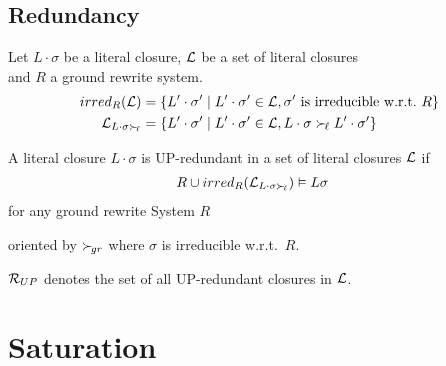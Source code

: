 \documentclass[%
handout,
]{beamer}
\begin{document}
\subsection{Redundancy}
\begin{frame}%
    \begin{definition}
        Let $L\cdot\sigma$ be a literal closure,
        $\mathcal{L}$ be a set of literal closures\\
        and $R$ a ground rewrite system.
        \begin{align*}
            irred_R(\mathcal{L}) &= \{
                L'\cdot\sigma' \mid
                L'\cdot\sigma'\in\mathcal{L},
                \sigma'\text{ is irreducible w.r.t.~}R
            \}
            \\
            \mathcal{L}_{L\cdot\sigma\mathrel\succ_{\!\ell}} &= \{
                L'\cdot\sigma' \mid
                L'\cdot\sigma'\in\mathcal{L},
                L\cdot\sigma\mathrel\succ_{\!\ell} L'\cdot\sigma'
            \}
        \end{align*}
    \end{definition}
\begin{definition}
    A literal closure $L\cdot\sigma$ is UP-redundant
    in a set of literal closures $\mathcal{L}$ if
    \begin{align*}
        R \cup irred_R(\mathcal{L}_{L\cdot\sigma\mathrel\succ_{\!\ell}}) &\vDash L\sigma
    \end{align*}
    for any ground rewrite System $R$

    oriented by $\mathrel\succ_{\!gr}$ where $\sigma$ is irreducible w.r.t.~$R$.

    $\mathcal{R}_{UP}$ denotes the set of all UP-redundant closures in $\mathcal{L}$.






\end{definition}
\end{frame}

\section{Saturation}
\end{document}
